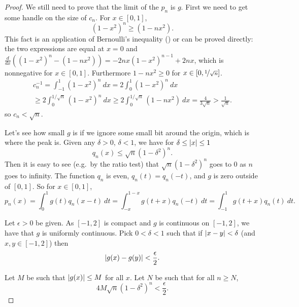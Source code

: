 \begin{proof}
We still need to prove that the limit of the $p_n$ is $g$.  First we need
to get some handle on the
size of $c_n$.  For $x \in [0,1]$,
\begin{equation*}
{(1-x^2)}^n \geq (1-nx^2) .
\end{equation*}
This fact is an application of Bernoulli's inequality () or can be 
proved directly:
the two expressions are equal at $x=0$ and 
$\frac{d}{dx}\left({(1-x^2)}^n - (1-nx^2)\right)
=-2nx{(1-x^2)}^{n-1}+2nx$, which is nonnegative for $x \in [0,1]$.
Furthermore $1-nx^2 \geq 0$ for $x \in [0,\nicefrac{1}{\sqrt{n}}]$.
\begin{multline*}
c_n^{-1}  = \int_{-1}^1 {(1-x^2)}^n ~ dx
= 2\int_0^1 {(1-x^2)}^n ~ dx \\
\geq 2\int_0^{1/\sqrt{n}} {(1-x^2)}^n ~ dx
\geq 2\int_0^{1/\sqrt{n}} (1-nx^2)  ~ dx
= \frac{4}{3\sqrt{n}}
> \frac{1}{\sqrt{n}} .
\end{multline*}
so $c_n < \sqrt{n}$.

Let's see how small $g$ is if we ignore some small bit around the origin,
which is where the peak is.
Given any $\delta > 0$, $\delta < 1$, we have for $\delta \leq \lvert {x} \rvert \leq
1$
\begin{equation*}
q_n(x) \leq \sqrt{n}{(1-\delta^2)}^n .
\end{equation*}
Then it is easy to see (e.g.\ by the ratio test) that
$\sqrt{n}{(1-\delta^2)}^n$ goes to 0 as $n$ goes to infinity.
The function $q_n$ is even, $q_n(t) = q_n(-t)$, and $g$
is zero outside of $[0,1]$.
So for $x \in [0,1]$,
\begin{equation*}
p_n(x) = 
\int_{0}^1 g(t)q_n(x-t)  ~ dt
=
\int_{-x}^{1-x} g(t+x)q_n(-t)  ~ dt
=
\int_{-1}^{1} g(t+x)q_n(t)  ~ dt .
\end{equation*}

Let $\epsilon > 0$ be given.
As $[-1,2]$ is compact and $g$ is continuous on $[-1,2]$, we have that $g$ is uniformly continuous.
Pick $0 < \delta < 1$ such that if
$\lvert {x-y} \rvert < \delta$ (and $x,y \in [-1,2]$) then
\begin{equation*}
\lvert {g(x)-g(y)} \rvert < \frac{\epsilon}{2} .
\end{equation*}

Let $M$ be such that $\lvert {g(x)} \rvert \leq M$ for all $x$.  Let $N$ be
such that for all $n \geq N$,
\begin{equation*}
4M\sqrt{n}{(1-\delta^2)}^n < \frac{\epsilon}{2} .
\end{equation*}


\end{proof}

